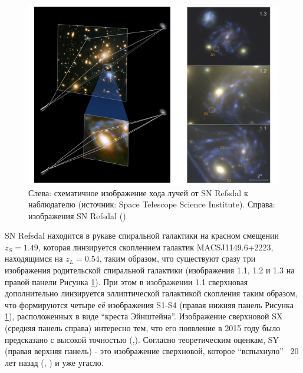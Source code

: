 \begin{figure}[h!]
    \centering
	\includegraphics[scale=0.8]{pics/snrefsdal.png}
	\caption{Слева: схематичное изображение хода лучей от SN Refsdal к  наблюдателю (источник: Space Telescope Science Institute). Справа: изображения SN Refsdal (\cite{treu2015}) \label{fig:snrefsdalfig}}
\end{figure}

SN Refsdal находится в рукаве спиральной галактики на красном смещении $z_S= 1.49$, которая линзируется скоплением галактик MACSJ1149.6+2223, находящимся на $z_L= 0.54$, таким образом, что существуют сразу три изображения родительской спиральной галактики (изображения 1.1, 1.2 и 1.3 на правой панели Рисунка \ref{fig:snrefsdalfig}). При этом в изображении 1.1 сверхновая дополнительно линзируется эллиптической галактикой скопления таким образом, что формируются четыре её изображения S1-S4 (правая нижняя панель Рисунка \ref{fig:snrefsdalfig}), расположенных в виде “креста Эйнштейна”. Изображение сверхновой SX (средняя панель справа) интересно тем, что его появление в 2015 году было предсказано с высокой точностью (\cite{kelly2014},\cite{treu2015}). Согласно теоретическим оценкам, SY (правая верхняя панель) - это изображение сверхновой, которое “вспыхнуло” ~20 лет назад (\cite{kelly2014}, \cite{treu2015}) и уже угасло.
